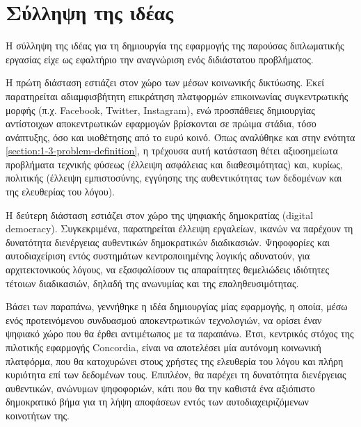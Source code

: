 \section{Σύλληψη της ιδέας} \label{section:3-1-idea-conception}

Η σύλληψη της ιδέας για τη δημιουργία της εφαρμογής της παρούσας διπλωματικής εργασίας είχε ως εφαλτήριο την αναγνώριση ενός διδιάστατου προβλήματος.

Η πρώτη διάσταση εστιάζει στον χώρο των μέσων κοινωνικής δικτύωσης. Εκεί παρατηρείται αδιαμφισβήτητη επικράτηση πλατφορμών επικοινωνίας συγκεντρωτικής μορφής (π.χ. Facebook, Twitter, Instagram), ενώ προσπάθειες δημιουργίας αντίστοιχων αποκεντρωτικών εφαρμογών βρίσκονται σε πρώιμα στάδια, τόσο ανάπτυξης, όσο και υιοθέτησης από το ευρύ κοινό. Όπως αναλύθηκε και στην ενότητα \ref{section:1-3-problem-definition}, η τρέχουσα αυτή κατάσταση θέτει αξιοσημείωτα προβλήματα τεχνικής φύσεως (έλλειψη ασφάλειας και διαθεσιμότητας) και, κυρίως, πολιτικής (έλλειψη εμπιστοσύνης, εγγύησης της αυθεντικότητας των δεδομένων και της ελευθερίας του λόγου).

Η δεύτερη διάσταση εστιάζει στον χώρο της ψηφιακής δημοκρατίας (digital democracy). Συγκεκριμένα, παρατηρείται έλλειψη  εργαλείων, ικανών να παρέχουν τη δυνατότητα διενέργειας αυθεντικών δημοκρατικών διαδικασιών. Ψηφοφορίες και αυτοδιαχείριση εντός συστημάτων κεντροποιημένης λογικής αδυνατούν, για αρχιτεκτονικούς λόγους, να εξασφαλίσουν τις απαραίτητες θεμελιώδεις ιδιότητες τέτοιων διαδικασιών, δηλαδή της ανωνυμίας και της επαληθευσιμότητας.

Βάσει των παραπάνω, γεννήθηκε η ιδέα δημιουργίας μίας εφαρμογής, η οποία, μέσω ενός προτεινόμενου συνδυασμού αποκεντρωτικών τεχνολογιών, να ορίσει έναν ψηφιακό χώρο που θα έρθει αντιμέτωπος με τα παραπάνω. Έτσι, κεντρικός στόχος της πιλοτικής εφαρμογής Concordia, είναι να αποτελέσει μία αυτόνομη κοινωνική πλατφόρμα, που θα κατοχυρώνει στους χρήστες της ελευθερία του λόγου και πλήρη κυριότητα επί των δεδομένων τους. Επιπλέον, θα παρέχει τη δυνατότητα διενέργειας αυθεντικών, ανώνυμων ψηφοφοριών, κάτι που θα την καθιστά ένα αξιόπιστο δημοκρατικό βήμα για τη λήψη αποφάσεων εντός των αυτοδιαχειριζόμενων κοινοτήτων της.

\newpage